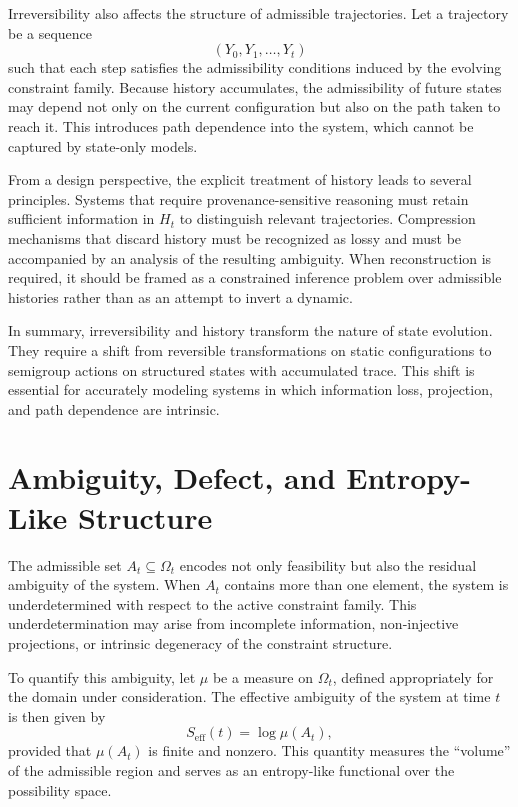 \documentclass[11pt,oneside]{article}
\begin{document}
Irreversibility also affects the structure of admissible trajectories. Let a trajectory be a sequence
\[
(Y_0, Y_1, \dots, Y_t)
\]
such that each step satisfies the admissibility conditions induced by the evolving constraint family. Because history accumulates, the admissibility of future states may depend not only on the current configuration but also on the path taken to reach it. This introduces path dependence into the system, which cannot be captured by state-only models.

From a design perspective, the explicit treatment of history leads to several principles. Systems that require provenance-sensitive reasoning must retain sufficient information in \( H_t \) to distinguish relevant trajectories. Compression mechanisms that discard history must be recognized as lossy and must be accompanied by an analysis of the resulting ambiguity. When reconstruction is required, it should be framed as a constrained inference problem over admissible histories rather than as an attempt to invert a dynamic.

In summary, irreversibility and history transform the nature of state evolution. They require a shift from reversible transformations on static configurations to semigroup actions on structured states with accumulated trace. This shift is essential for accurately modeling systems in which information loss, projection, and path dependence are intrinsic.

\section{Ambiguity, Defect, and Entropy-Like Structure}

The admissible set \( A_t \subseteq \Omega_t \) encodes not only feasibility but also the residual ambiguity of the system. When \( A_t \) contains more than one element, the system is underdetermined with respect to the active constraint family. This underdetermination may arise from incomplete information, non-injective projections, or intrinsic degeneracy of the constraint structure.

To quantify this ambiguity, let \( \mu \) be a measure on \( \Omega_t \), defined appropriately for the domain under consideration. The effective ambiguity of the system at time \( t \) is then given by
\[
S_{\mathrm{eff}}(t) = \log \mu(A_t),
\]
provided that \( \mu(A_t) \) is finite and nonzero. This quantity measures the “volume” of the admissible region and serves as an entropy-like functional over the possibility space.
\end{document}
